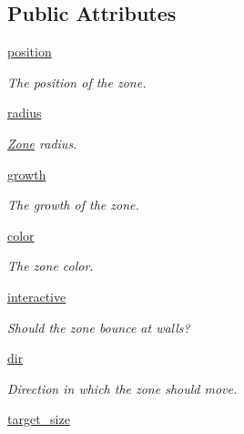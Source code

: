 \subsection*{Public Attributes}
\begin{DoxyCompactItemize}
\item 
\hyperlink{class_zone_1_1_zone_ae30b162378f40661dfcb854ec7926bdb}{position}
\begin{DoxyCompactList}\small\item\em The position of the zone. \item\end{DoxyCompactList}\item 
\hyperlink{class_zone_1_1_zone_a6ee5fd031ade8ecb6b2f41455ad309c4}{radius}
\begin{DoxyCompactList}\small\item\em \hyperlink{class_zone_1_1_zone}{Zone} radius. \item\end{DoxyCompactList}\item 
\hyperlink{class_zone_1_1_zone_a42d231813671766976464bbf2dfdf387}{growth}
\begin{DoxyCompactList}\small\item\em The growth of the zone. \item\end{DoxyCompactList}\item 
\hyperlink{class_zone_1_1_zone_a0e94d3602835417fef9d1345cf1e739c}{color}
\begin{DoxyCompactList}\small\item\em The zone color. \item\end{DoxyCompactList}\item 
\hyperlink{class_zone_1_1_zone_a574bf43b0f15767743c104faabbae973}{interactive}
\begin{DoxyCompactList}\small\item\em Should the zone bounce at walls? \item\end{DoxyCompactList}\item 
\hyperlink{class_zone_1_1_zone_a20a50ae6ea7f05c4bb403ef0306ba83f}{dir}
\begin{DoxyCompactList}\small\item\em Direction in which the zone should move. \item\end{DoxyCompactList}\item 
\hyperlink{class_zone_1_1_zone_a9962b673a138b53b1631158d18cf5279}{target\_\-size}

\end{DoxyCompactItemize}
